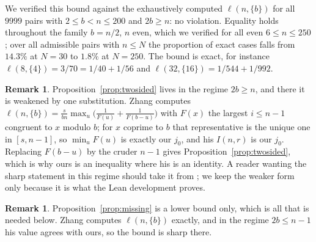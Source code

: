 \documentclass[11pt]{amsart}
\theoremstyle{plain}
\theoremstyle{definition}
\newtheorem{remark}[theorem]{Remark}
\begin{document}
We verified this bound against the exhaustively computed $\ell(n,\{b\})$ for all $9999$ pairs with
$2\le b<n\le200$ and $2b\ge n$: no violation. Equality holds throughout the family $b=n/2$, $n$ even, which we verified for all even $6\le n\le250$; over all admissible pairs with $n\le N$ the proportion of exact cases falls from $14.3\%$ at $N=30$ to $1.8\%$ at $N=250$. The bound is exact, for instance
$\ell(8,\{4\})=3/70=1/40+1/56$ and $\ell(32,\{16\})=1/544+1/992$.

\begin{remark}\label{rem:zhang4}
Proposition~\ref{prop:twosided} lives in the regime $2b\ge n$, and there it is
\cite[Thm.~1.4]{zhang} weakened by one substitution. Zhang computes
$\ell(n,\{b\})=\frac{s}{bn}\max_u\bigl(\frac1{F(u)}+\frac1{F(b-u)}\bigr)$ with $F(x)$ the largest
$i\le n-1$ congruent to $x$ modulo $b$; for $x$ coprime to $b$ that representative is the unique one
in $[s,n-1]$, so $\min_u F(u)$ is exactly our $j_0$, and his $I(n,r)$ is our $j_0$. Replacing
$F(b-u)$ by the cruder $n-1$ gives Proposition~\ref{prop:twosided}, which is why ours is an
inequality where his is an identity. A reader wanting the sharp statement in this regime should take
it from \cite{zhang}; we keep the weaker form only because it is what the Lean development proves.
\end{remark}

\begin{remark}\label{rem:zhang}
Proposition~\ref{prop:missing} is a lower bound only, which is all that is needed below. Zhang
\cite[Thm.~1.4]{zhang} computes $\ell(n,\{b\})$ exactly, and in the regime $2b\le n-1$ his value
agrees with ours, so the bound is sharp there.
\end{remark}
\end{document}
